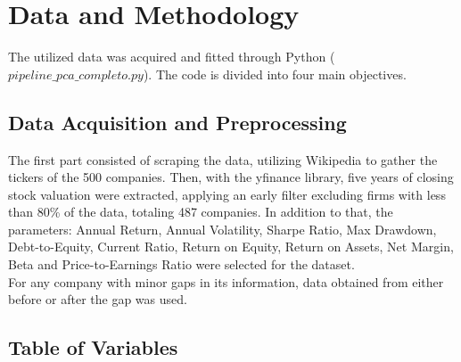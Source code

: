 \documentclass[eng]{ajceam-class}
\begin{document}
\section{Data and Methodology}

The utilized data was acquired and fitted through Python ($pipeline\_pca\_completo.py$). The code is divided into four main objectives.

\subsection{Data Acquisition and Preprocessing}

The first part consisted of scraping the data, utilizing Wikipedia to gather the tickers of the 500 companies. Then, with the yfinance library, five years of closing stock valuation were extracted, applying an early filter excluding firms with less than 80\% of the data, totaling 487 companies. In addition to that, the parameters: Annual Return, Annual Volatility, Sharpe Ratio, Max Drawdown, Debt-to-Equity, Current Ratio, Return on Equity, Return on Assets, Net Margin, Beta and Price-to-Earnings Ratio were selected for the dataset.\\

For any company with minor gaps in its information, data obtained from either before or after the gap was used.

\subsection{Table of Variables}
\end{document}
